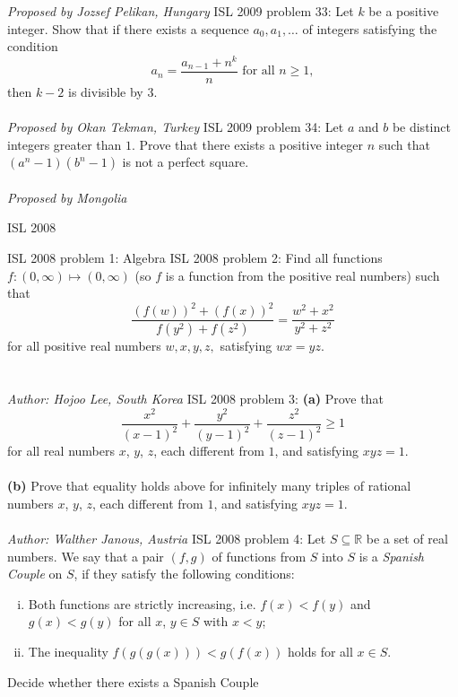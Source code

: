 \textit{Proposed by Jozsef Pelikan, Hungary} 
ISL 2009 problem 33:  Let $k$ be a positive integer. Show that if there exists a sequence $a_0,a_1,\ldots$ of integers satisfying the condition
\[ a_n=\frac{a_{n-1}+n^k}{n}\text{ for all } n\geq 1, \]
then $k-2$ is divisible by $3$. \\\\
\textit{Proposed by Okan Tekman, Turkey} 
ISL 2009 problem 34:  Let $a$ and $b$ be distinct integers greater than $1$. Prove that there exists a positive integer $n$ such that $(a^n-1)(b^n-1)$ is not a perfect square. \\\\
\textit{Proposed by Mongolia} 

ISL 2008 

ISL 2008 problem 1:  Algebra 
ISL 2008 problem 2:  Find all functions $ f: (0, \infty) \mapsto (0, \infty)$ (so $ f$ is a function from the positive real numbers) such that
\[
\frac {\left( f(w) \right)^2 + \left( f(x) \right)^2}{f(y^2) + f(z^2) } = \frac {w^2 + x^2}{y^2 + z^2}
\]
for all positive real numbers $ w,x,y,z,$ satisfying $ wx = yz.$ \\\\\\
\textit{Author: Hojoo Lee, South Korea} 
ISL 2008 problem 3:  \textbf{(a)} Prove that
\[
\frac {x^2}{\left(x - 1\right)^2} + \frac {y^2}{\left(y - 1\right)^2} + \frac {z^2}{\left(z - 1\right)^2} \geq 1
\]
for all real numbers $x$, $y$, $z$, each different from $1$, and satisfying $xyz=1$. \\\\
\textbf{(b)} Prove that equality holds above for infinitely many triples of rational numbers $x$, $y$, $z$, each different from $1$, and satisfying $xyz=1$. \\\\
\textit{Author: Walther Janous, Austria} 
ISL 2008 problem 4:  Let $ S\subseteq\mathbb{R}$ be a set of real numbers. We say that a pair $ (f, g)$ of functions from $ S$ into $ S$ is a \textit{Spanish Couple} on $ S$, if they satisfy the following conditions:
\begin{enumerate}[(i)]
  \item Both functions are strictly increasing, i.e. $ f(x) < f(y)$ and $ g(x) < g(y)$ for all $ x$, $ y\in S$ with $ x < y$;
  \item The inequality $ f\left(g\left(g\left(x\right)\right)\right) < g\left(f\left(x\right)\right)$ holds for all $ x\in S$.
\end{enumerate}
Decide whether there exists a Spanish Couple

